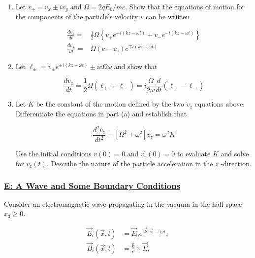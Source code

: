 \begin{enumerate}
	\item Let $v_{\pm}=v_{x} \pm i v_{y}$ and $\Omega=2 q E_{0} / m c .$ Show that the equations of motion for the components of the particle's velocity $v$ can be written
	
	\begin{subequations}
		\begin{align}
			\frac{d v_{z}}{d t}=&\frac{1}{2} \Omega\left\{v_{+} e^{+i(k z-\omega t)}+v_{-} e^{-i(k z-\omega t)}\right\} \\
			\frac{d v_{\pm}}{d t}=&\Omega\left(c-v_{z}\right) e^{\mp i(k z-\omega t)}
		\end{align}
	\end{subequations}

	\item Let $\ell_{\pm}=v_{\pm} e^{\pm i(k z-\omega t)} \pm i c \Omega \omega$ and show that

	\begin{equation}
		\frac{d v_{z}}{d t}=\frac{1}{2} \Omega\left(\ell_{+}+\ell_{-}\right)=i \frac{\Omega}{2 \omega} \frac{d}{d t}\left(\ell_{+}-\ell_{-}\right)
	\end{equation}
	
	\item Let $K$ be the constant of the motion defined by the two $\dot{v}_{z}$ equations above. Differentiate the equations in part (a) and establish that

	\begin{equation}
		\frac{d^{2} v_{z}}{d t^{2}}+\left[\Omega^{2}+\omega^{2}\right] v_{z}=\omega^{2} K
	\end{equation}

	Use the initial conditions $v(0)=0$ and $v_{z}^{\prime}(0)=0$ to evaluate $K$ and solve for $v_{z}(t) .$ Describe the nature of the particle acceleration in the $z$ -direction.
\end{enumerate}

\subsubsection{\hyperref[E: A Wave and Some Boundary Conditions]{E: A Wave and Some Boundary Conditions}}

Consider an electromagnetic wave propagating in the vacuum in the half-space $x_{3} \geq 0$.

\begin{subequations}
	\begin{align}
		\vec{E}_{i}(\vec{x}, t)&=\vec{E}_{0} e^{\mathrm{i} \vec{k} \cdot \vec{x}-\mathrm{i} \omega t} ,\\
		\vec{B}_{i}(\vec{x}, t)&=\frac{\hat{k}}{c} \times \vec{E},
	\end{align}
\end{subequations}

